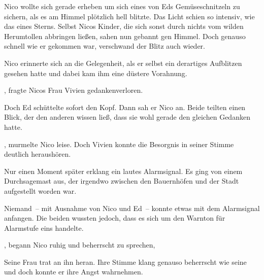 \par

Nico wollte sich gerade erheben um sich eines von Eds Gemüseschnitzeln zu sichern, als es am Himmel plötzlich hell blitzte. Das Licht schien so intensiv, wie das eines Sterns. Selbst Nicos Kinder, die sich sonst durch nichts vom wilden Herumtollen abbringen ließen, sahen nun gebannt gen Himmel. Doch genauso schnell wie er gekommen war, verschwand der Blitz auch wieder.

\par

Nico erinnerte sich an die Gelegenheit, als er selbst ein derartiges Aufblitzen gesehen hatte und dabei kam ihm eine düstere Vorahnung.

\par

, fragte Nicos Frau Vivien gedankenverloren. 

\par

Doch Ed schüttelte sofort den Kopf.  Dann sah er Nico an. Beide teilten einen Blick, der den anderen wissen ließ, dass sie wohl gerade den gleichen Gedanken hatte.

\par

, murmelte Nico leise. Doch Vivien konnte die Besorgnis in seiner Stimme deutlich heraushören.

\par

Nur einen Moment später erklang ein lautes Alarmsignal. Es ging von einem Durchsagemast aus, der irgendwo zwischen den Bauernhöfen und der Stadt aufgestellt worden war.

\par

Niemand~-- mit Ausnahme von Nico und Ed~-- konnte etwas mit dem Alarmsignal anfangen. Die beiden wussten jedoch, dass es sich um den Warnton für Alarmstufe eins handelte.

\par

, begann Nico ruhig und beherrscht zu sprechen, 

\par

Seine Frau trat an ihn heran. Ihre Stimme klang genauso beherrscht wie seine und doch konnte er ihre Angst wahrnehmen. 

